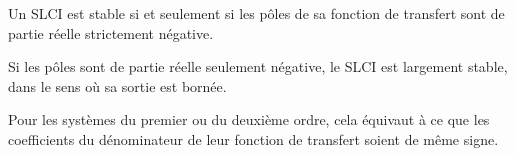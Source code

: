 ﻿\documentclass[a4paper]{article}
\begin{document}
\pagestyle{fancy}
\fancyhf{}
\setlength{\headheight}{15pt}

\begin{center}
	\large{}
\end{center}


Un SLCI est stable si et seulement si les pôles de sa fonction de transfert sont de partie réelle strictement négative.

Si les pôles sont de partie réelle seulement négative, le SLCI est largement stable, dans le sens où sa sortie est bornée.

Pour les systèmes du premier ou du deuxième ordre, cela équivaut à ce que les coefficients du dénominateur de leur fonction de transfert soient de même signe.
\end{document}

